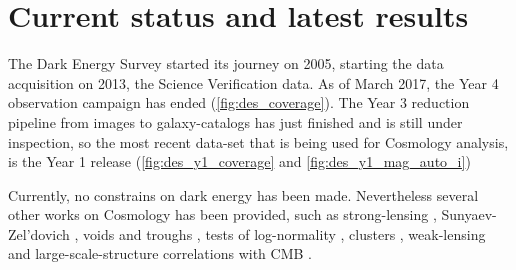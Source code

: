 \section{Current status and latest results}
The Dark Energy Survey started its journey on 2005, starting the data acquisition on 2013, the Science Verification data. As of March 2017, the Year 4 observation campaign has ended (\autoref{fig:des_coverage}). The Year 3 reduction pipeline from images to galaxy-catalogs has just finished and is still under inspection, so the most recent data-set that is being used for Cosmology analysis, is the Year 1 release (\autoref{fig:des_y1_coverage} and \autoref{fig:des_y1_mag_auto_i}) 
\newline

Currently, no constrains on dark energy has been made. Nevertheless several other works on Cosmology has been provided, such as strong-lensing \cite{2015MNRAS.454.1260A,2016ApJ...827...51N,2017ApJ...838L..15L}, Sunyaev-Zel'dovich \cite{2016arXiv160508770S}, voids and troughs \cite{2016MNRAS.455.3367G,2017MNRAS.465..746S}, tests of log-normality \cite{2017MNRAS.466.1444C}, clusters \cite{2017MNRAS.467.4015H}, weak-lensing \cite{2015PhRvD..92b2006V,2016PhRvD..94b2002B,2016MNRAS.459...21K,2016MNRAS.461.3172S,2016MNRAS.461.4099B,2016arXiv160908167P,2017MNRAS.465.4204C} and large-scale-structure correlations with CMB \cite{2016MNRAS.456.3213G,2016MNRAS.459...21K,2017MNRAS.465.4166K}.
\newline

